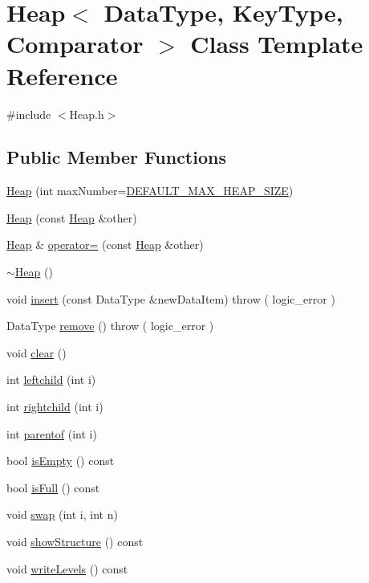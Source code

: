 \hypertarget{class_heap}{\section{Heap$<$ Data\+Type, Key\+Type, Comparator $>$ Class Template Reference}
\label{class_heap}
}


{\ttfamily \#include $<$Heap.\+h$>$}

\subsection*{Public Member Functions}
\begin{DoxyCompactItemize}
\item 
\hyperlink{class_heap_ae17e34e3c86d88263a8fdf80b9ba78fc}{Heap} (int max\+Number=\hyperlink{class_heap_a967c19732a20a72e8e824402ad6763c8}{D\+E\+F\+A\+U\+L\+T\+\_\+\+M\+A\+X\+\_\+\+H\+E\+A\+P\+\_\+\+S\+I\+Z\+E})
\item 
\hyperlink{class_heap_a97e3b462be1c6af31d7519546bba8907}{Heap} (const \hyperlink{class_heap}{Heap} \&other)
\item 
\hyperlink{class_heap}{Heap} \& \hyperlink{class_heap_a5ed119341c39bcea1437321d4247dd40}{operator=} (const \hyperlink{class_heap}{Heap} \&other)
\item 
\hyperlink{class_heap_a555ade7891007de959bef0ee53e28767}{$\sim$\+Heap} ()
\item 
void \hyperlink{class_heap_aa68cf80454ab1b246fa723612805a91e}{insert} (const Data\+Type \&new\+Data\+Item)  throw ( logic\+\_\+error )
\item 
Data\+Type \hyperlink{class_heap_a4a18bfdacd897c45fc3da13f22b8930d}{remove} ()  throw ( logic\+\_\+error )
\item 
void \hyperlink{class_heap_a19a78c8eae2cf7c8253e34e54d86ed73}{clear} ()
\item 
int \hyperlink{class_heap_a6eee71300439f0d11cb8b3e7733fae23}{leftchild} (int i)
\item 
int \hyperlink{class_heap_ad7e6fc0f424633c3558b8b3e428a11d9}{rightchild} (int i)
\item 
int \hyperlink{class_heap_aa599eede8d07fbb74454ea9a81d0e735}{parentof} (int i)
\item 
bool \hyperlink{class_heap_ab8fa26d416ac0e27dfcbf18c54f8f73f}{is\+Empty} () const 
\item 
bool \hyperlink{class_heap_ac9111b884c74a376240e0155a788756e}{is\+Full} () const 
\item 
void \hyperlink{class_heap_a434f61cb55ab57148384188c5b1a2348}{swap} (int i, int n)
\item 
void \hyperlink{class_heap_a3ae1e1f27a145749c8b9f2da777cb8bc}{show\+Structure} () const 
\item 
void \hyperlink{class_heap_a4bdb1772ea92899de245d6cbd217d085}{write\+Levels} () const 
\end{DoxyCompactItemize}
